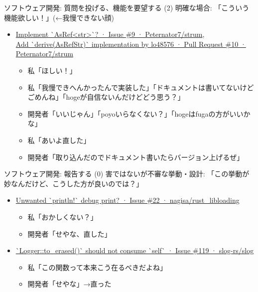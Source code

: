 \documentclass[
        unicode%
    ]{beamer}
\begin{document}
\begin{frame}{ソフトウェア開発: 質問を投げる、機能を要望する (2)}
    明確な場合: 「こういう機能欲しい！」(←我慢できない顔)

    \begin{itemize}
        \item
            \href{https://github.com/Peternator7/strum/issues/9}{Implement \`{}AsRef<str>\`{}? · Issue \#9 · Peternator7/strum}, \\
            \href{https://github.com/Peternator7/strum/pull/10}{Add \`{}derive(AsRefStr)\`{} implementation by lo48576 · Pull Request \#10 · Peternator7/strum}
            \begin{itemize}
                \item 私「ほしい！」
                \pause
                \item 私「我慢できへんかったんで実装した」「ドキュメントは書いてないけどごめんね」「hogeが自信ないんだけどどう思う？」
                \pause
                \item 開発者「いいじゃん」「poyoいらなくない？」「hogeはfugaの方がいいかな」
                \pause
                \item 私「あいよ直した」
                \pause
                \item 開発者「取り込んだのでドキュメント書いたらバージョン上げるぜ」
            \end{itemize}
    \end{itemize}
\end{frame}

\begin{frame}{ソフトウェア開発: 報告する (0)}
    害ではないが不審な挙動・設計: 「この挙動が妙なんだけど、こうした方が良いのでは？」

    \begin{itemize}
        \pause
        \item \href{https://github.com/nagisa/rust_libloading/issues/22}{Unwanted \`{}println!\`{} debug print? · Issue \#22 · nagisa/rust\_libloading}
            \begin{itemize}
                \item 私「おかしくない？」
                \item 開発者「せやな、直した」
            \end{itemize}
        \pause
        \item \href{https://github.com/slog-rs/slog/issues/119}{\`{}Logger::to\_erased()\`{} should not consume \`{}self\`{} · Issue \#119 · slog-rs/slog}
            \begin{itemize}
                \item 私「この関数って本来こう在るべきだよね」
                \item 開発者「せやな」→直った
            \end{itemize}
    \end{itemize}
\end{frame}
\end{document}
